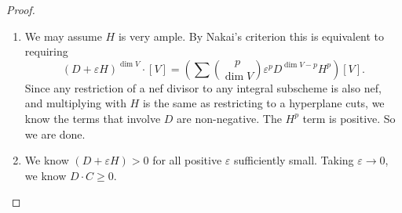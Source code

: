 \documentclass[a4paper]{article}
\begin{document}
\begin{proof}\leavevmode
  \begin{enumerate}
    \item We may assume $H$ is very ample. By Nakai's criterion this is equivalent to requiring
      \[
        (D + \varepsilon H)^{\dim V}\cdot [V] = \left(\sum \binom{p}{\dim V} \varepsilon^p D^{\dim V - p} H^p\right)[V].
      \]
      Since any restriction of a nef divisor to any integral subscheme is also nef, and multiplying with $H$ is the same as restricting to a hyperplane cuts, we know the terms that involve $D$ are non-negative. The $H^p$ term is positive. So we are done.

    \item We know $(D + \varepsilon H) > 0$ for all positive $\varepsilon$ sufficiently small. Taking $\varepsilon \to 0$, we know $D \cdot C \geq 0$.
  \end{enumerate}
\end{proof}
\end{document}
